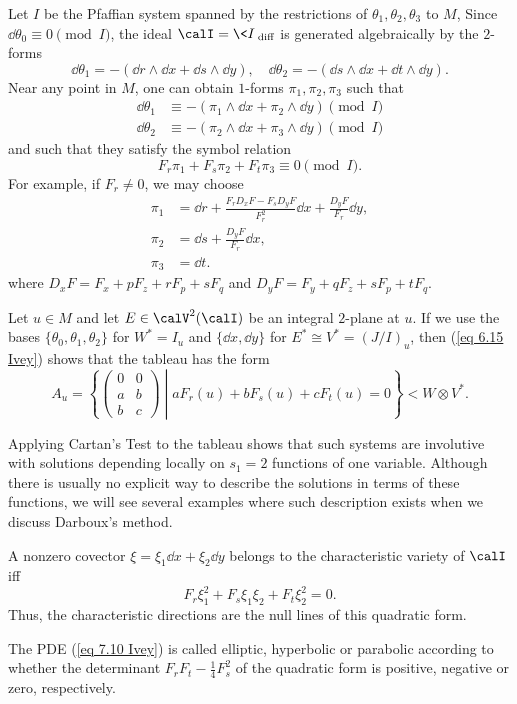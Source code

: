 Let $I$ be the Pfaffian system spanned by the restrictions of $\theta_1,\theta_2,\theta_3$ to $M$, Since $\dd\theta_0\equiv 0\pmod{I}$, the ideal $\calI=\<I\>_{\mathrm{diff}}$ is generated algebraically by the $2$-forms 
\[\dd\theta_1=-(\dd r\wedge \dd x+\dd s\wedge \dd y),\quad \dd\theta_2=-(\dd s\wedge\dd x+\dd t\wedge\dd y).\]
Near any point in $M$, one can obtain $1$-forms $\pi_1,\pi_2,\pi_3$ such that 
\begin{align}
    \dd\theta_1& \equiv -(\pi_1\wedge \dd x+\pi_2\wedge\dd y )\pmod{I} \\
    \dd\theta_2& \equiv -(\pi_2\wedge\dd x+\pi_3\wedge\dd y) \pmod{I}
\end{align}
and such that they satisfy the symbol relation 
\[F_r\pi_1+F_s\pi_2+F_t\pi_3\equiv 0\pmod{I}.\label{eq 6.15 Ivey}\]
For example, if $F_r\neq 0$, we may choose 
\begin{align}
    \pi_1&= \dd r+\frac{F_rD_xF-F_sD_yF}{F_r^2}\dd x+\frac{D_y F}{F_r}\dd y,\\
    \pi_2&=\dd s+\frac{D_y F}{F_r}\dd x,\\
    \pi_3&=\dd t.
\end{align}
where $D_xF=F_x+pF_z+rF_p+sF_q$ and $D_yF=F_y+qF_z+sF_p+tF_q$.

Let $u\in M$ and let $E\in \calV^2(\calI)$ be an integral $2$-plane at $u$. If we use the bases $\{\theta_0,\theta_1,\theta_2\}$ for $W^\ast=I_u$ and $\{\dd x,\dd y\}$ for $E^\ast\cong V^\ast=(J\slash I)_u$, then (\ref{eq 6.15 Ivey}) shows that the tableau has the form 
\[A_u=
    \left\{
\begin{pmatrix}
    0 & 0\\
    a & b\\
    b& c
\end{pmatrix}
    \middle| aF_r(u)+bF_s(u)+cF_t(u)=0
    \right\}<W\otimes V^\ast.
\]

Applying Cartan's Test to the tableau shows that such systems are involutive with solutions depending locally on $s_1=2$ functions of one variable. Although there is usually no explicit way to describe the solutions in terms of these functions, we will see several examples where such description exists when we discuss Darboux's method.

A nonzero covector $\xi=\xi_1\dd x+\xi_2\dd y$ belongs to the characteristic variety of $\calI$ iff 
\[ F_r\xi_1^2+F_s\xi_1\xi_2+F_t\xi_2^2=0.\label{eq 7.11 Ivey}\]
Thus, the characteristic directions are the null lines of this quadratic form.

\begin{defn}
    The PDE (\ref{eq 7.10 Ivey}) is called elliptic, hyperbolic or parabolic according  to whether the determinant $F_rF_t-\frac{1}{4}F_s^2$ of the quadratic form is positive, negative or zero, respectively.
\end{defn}


